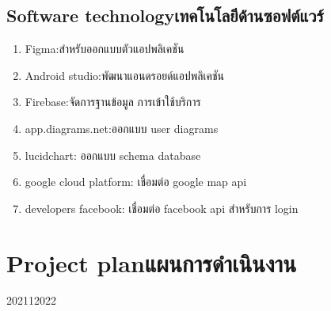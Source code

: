 \subsection{\ifenglish Software technology\else เทคโนโลยีด้านซอฟต์แวร์\fi}
\begin{enumerate}
    \item Figma:สําหรับออกแบบตัวแอปพลิเคชัน  
    \item Android studio:พัฒนาแอนดรอยด์แอปพลิเคชัน
    \item Firebase:จัดการฐานข้อมูล การเข้าใช้บริการ
    \item app.diagrams.net:ออกแบบ user diagrams
    \item lucidchart: ออกแบบ schema database
    \item google cloud platform: เชื่อมต่อ google map api
    \item developers facebook: เชื่อมต่อ facebook api สำหรับการ login
\end{enumerate}
\section{\ifenglish Project plan\else แผนการดำเนินงาน\fi}

\begin{plan}{7}{2021}{1}{2022}
\end{plan}



